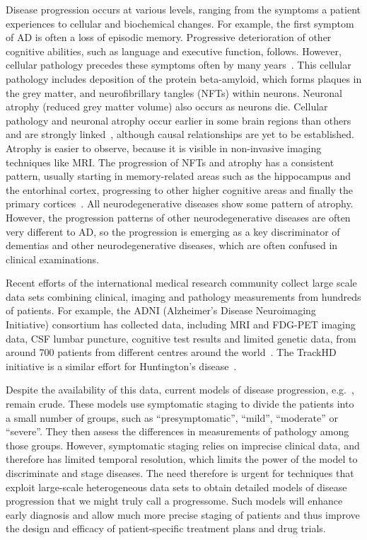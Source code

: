\documentclass[a4paper,11pt]{article}
\begin{document}
Disease progression occurs at various levels, ranging from the
symptoms a patient experiences to cellular and biochemical
changes. For example, the first symptom of AD is often a loss of
episodic memory. Progressive deterioration of other cognitive
abilities, such as language and executive function, follows. However,
cellular pathology precedes these symptoms often by many years~\cite{DickersonCerCort09,ScahillPNAS02,ThompsonCerCort01,ThompsonJNeurosci03}. This cellular pathology includes deposition of the protein
beta-amyloid, which forms plaques in the grey matter, and
neurofibrillary tangles (NFTs) within neurons.  Neuronal atrophy
(reduced grey matter volume) also occurs as neurons die.  Cellular
pathology and neuronal atrophy occur earlier in some brain regions
than others and are strongly linked~\cite{HerrupJNeurosci10}, although causal relationships
are yet to be established. Atrophy is easier to observe, because it is
visible in non-invasive imaging techniques like MRI.  The progression
of NFTs and atrophy has a consistent pattern, usually starting in
memory-related areas such as the hippocampus and the entorhinal
cortex, progressing to other higher cognitive areas and finally the
primary cortices~\cite{BraakActaNeuro91}.  All neurodegenerative diseases show some
pattern of atrophy.  However, the progression patterns of other
neurodegenerative diseases are often very different to AD, so the
progression is emerging as a key discriminator of dementias and other
neurodegenerative diseases, which are often confused in clinical
examinations.

Recent efforts of the international medical research community collect
large scale data sets combining clinical, imaging and pathology
measurements from hundreds of patients.  For example, the ADNI
(Alzheimer's Disease Neuroimaging Initiative) consortium has collected
data, including MRI and FDG-PET imaging data, CSF lumbar puncture,
cognitive test results and limited genetic data, from around 700
patients from different centres around the
world~\cite{MuellerAlzDement05}.  The TrackHD initiative is a similar
effort for Huntington's disease~\cite{TabriziLancetNeurol09}.

Despite the availability of this data, current models of disease
progression,
e.g.~\cite{DickersonCerCort09,ScahillPNAS02,ThompsonCerCort01,ThompsonJNeurosci03,JackLancetNeurol10},
remain crude. These models use symptomatic staging to divide the
patients into a small number of groups, such as ``presymptomatic'',
``mild'', ``moderate'' or ``severe''. They then assess the differences
in measurements of pathology among those groups. However, symptomatic
staging relies on imprecise clinical data, and therefore has limited
temporal resolution, which limits the power of the model to
discriminate and stage diseases. The need therefore is urgent for
techniques that exploit large-scale heterogeneous data sets to obtain
detailed models of disease progression that we might truly call a
progressome. Such models will enhance early diagnosis and allow much
more precise staging of patients and thus improve the design and
efficacy of patient-specific treatment plans and drug trials.
\end{document}
